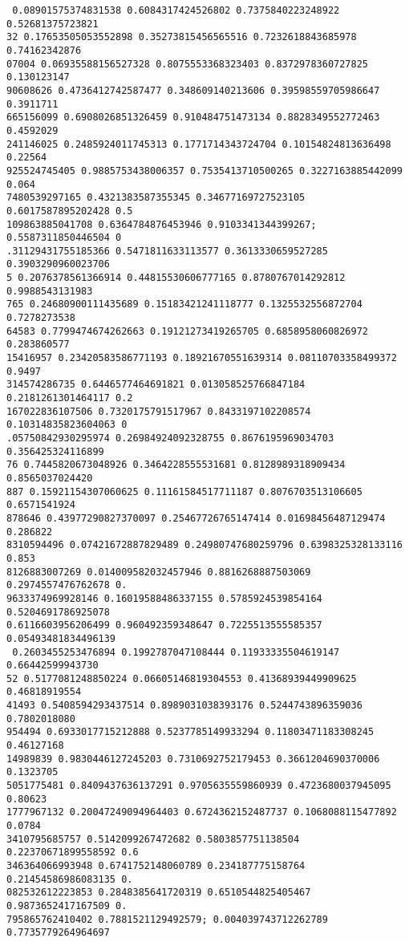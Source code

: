 \documentclass[12pt,a4paper]{article}
\begin{document}
\begin{lstlisting}
 0.08901575374831538 0.6084317424526802 0.7375840223248922 0.52681375723821
32 0.17653505053552898 0.35273815456565516 0.7232618843685978 0.74162342876
07004 0.06935588156527328 0.8075553368323403 0.8372978360727825 0.130123147
90608626 0.4736412742587477 0.348609140213606 0.39598559705986647 0.3911711
665156099 0.6908026851326459 0.910484751473134 0.8828349552772463 0.4592029
241146025 0.2485924011745313 0.1771714343724704 0.10154824813636498 0.22564
925524745405 0.9885753438006357 0.7535413710500265 0.3227163885442099 0.064
7480539297165 0.4321383587355345 0.34677169727523105 0.6017587895202428 0.5
109863885041708 0.6364784876453946 0.9103341344399267; 0.5587311850446504 0
.31129431755185366 0.5471811633113577 0.3613330659527285 0.3903290960023706
5 0.2076378561366914 0.44815530606777165 0.8780767014292812 0.9988543131983
765 0.24680900111435689 0.15183421241118777 0.1325532556872704 0.7278273538
64583 0.7799474674262663 0.19121273419265705 0.6858958060826972 0.283860577
15416957 0.23420583586771193 0.18921670551639314 0.08110703358499372 0.9497
314574286735 0.6446577464691821 0.013058525766847184 0.2181261301464117 0.2
167022836107506 0.7320175791517967 0.8433197102208574 0.10314835823604063 0
.05750842930295974 0.26984924092328755 0.8676195969034703 0.356425324116899
76 0.7445820673048926 0.3464228555531681 0.8128989318909434 0.8565037024420
887 0.15921154307060625 0.11161584517711187 0.8076703513106605 0.6571541924
878646 0.43977290827370097 0.25467726765147414 0.01698456487129474 0.286822
8310594496 0.07421672887829489 0.24980747680259796 0.6398325328133116 0.853
8126883007269 0.014009582032457946 0.8816268887503069 0.2974557476762678 0.
9633374969928146 0.16019588486337155 0.5785924539854164 0.5204691786925078 
0.6116603956206499 0.960492359348647 0.7225513555585357 0.05493481834496139
 0.2603455253476894 0.1992787047108444 0.11933335504619147 0.66442599943730
52 0.5177081248850224 0.06605146819304553 0.41368939449909625 0.46818919554
41493 0.5408594293437514 0.8989031038393176 0.5244743896359036 0.7802018080
954494 0.6933017715212888 0.5237785149933294 0.11803471183308245 0.46127168
14989839 0.9830446127245203 0.7310692752179453 0.3661204690370006 0.1323705
5051775481 0.8409437636137291 0.9705635559860939 0.4723680037945095 0.80623
1777967132 0.20047249094964403 0.6724362152487737 0.1068088115477892 0.0784
3410795685757 0.5142099267472682 0.5803857751138504 0.22370671899558592 0.6
346364066993948 0.6741752148060789 0.234187775158764 0.21454586986083135 0.
082532612223853 0.2848385641720319 0.6510544825405467 0.9873652417167509 0.
795865762410402 0.7881521129492579; 0.004039743712262789 0.7735779264964697

\end{lstlisting}
\end{document}
